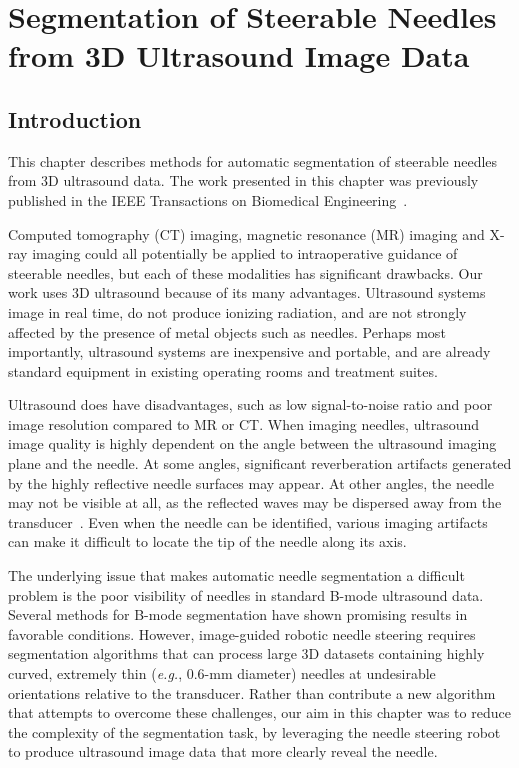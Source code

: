 \chapter[Segmentation from 3D Ultrasound]{Segmentation of Steerable Needles from 3D Ultrasound Image Data}

\section{Introduction}
This chapter describes methods for automatic segmentation of steerable needles from 3D ultrasound data. The work presented in this chapter was previously published in the IEEE Transactions on Biomedical Engineering~\cite{Adebar2014}.

Computed tomography (CT) imaging, magnetic resonance (MR) imaging and X-ray imaging could all potentially be applied to intraoperative guidance of steerable needles, but each of these modalities has significant drawbacks. Our work uses 3D ultrasound because of its many advantages. Ultrasound systems image in real time, do not produce ionizing radiation, and are not strongly affected by the presence of metal objects such as needles. Perhaps most importantly, ultrasound systems are inexpensive and portable, and are already standard equipment in existing operating rooms and treatment suites.  

Ultrasound does have disadvantages, such as low signal-to-noise ratio and poor image resolution compared to MR or CT. When imaging needles, ultrasound image quality is highly dependent on the angle between the ultrasound imaging plane and the needle. At some angles, significant reverberation artifacts generated by the highly reflective needle surfaces may appear. At other angles, the needle may not be visible at all, as the reflected waves may be dispersed away from the transducer~\cite{Chung2004}. Even when the needle can be identified, various imaging artifacts can make it difficult to locate the tip of the needle along its axis. 

The underlying issue that makes automatic needle segmentation a difficult problem is the poor visibility of needles in standard B-mode ultrasound data. Several methods for B-mode segmentation have shown promising results in favorable conditions. However, image-guided robotic needle steering requires segmentation algorithms that can process large 3D datasets containing highly curved, extremely thin (\textit{e.g.}, 0.6-mm diameter) needles at undesirable orientations relative to the transducer. Rather than contribute a new algorithm that attempts to overcome these challenges, our aim in this chapter was to reduce the complexity of the segmentation task, by leveraging the needle steering robot to produce ultrasound image data that more clearly reveal the needle.

